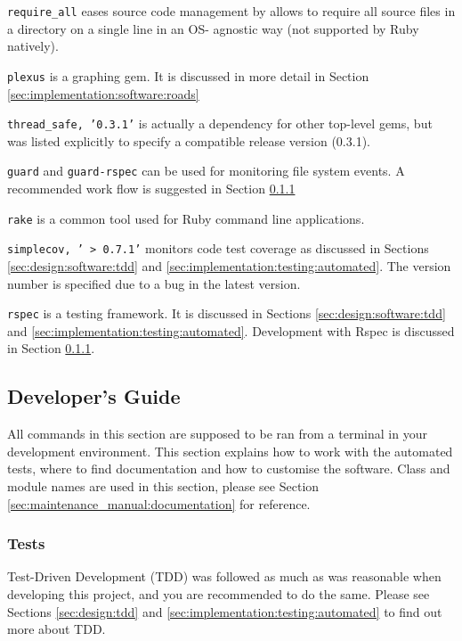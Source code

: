 \texttt{require\_all} \parencite{Require+all} eases source code management by
allows to require all source files in a directory on a single line in an OS-
agnostic way (not supported by Ruby natively).

\texttt{plexus} \parencite{Plexus} is a graphing gem. It is discussed in more
detail in Section \ref{sec:implementation:software:roads}

\texttt{thread\_safe, '0.3.1'} is actually a dependency for other top-level
gems, but was listed explicitly to specify a compatible release version
(0.3.1).

\texttt{guard} and \texttt{guard-rspec} \parencite{Guard} can be used for
monitoring file system events. A recommended work flow is suggested in Section
\ref{sec:maintenance_manual:testing}

\texttt{rake} \parencite{Rake} is a common tool used for Ruby command line
applications.

\texttt{simplecov, '~> 0.7.1'} \parencite{Simplecov} monitors code test
coverage as discussed in Sections \ref{sec:design:software:tdd} and
\ref{sec:implementation:testing:automated}. The version number is specified due
to a bug in the latest version.

\texttt{rspec} \parencite{Rspec} is a testing framework. It is discussed in
Sections \ref{sec:design:software:tdd} and
\ref{sec:implementation:testing:automated}. Development with Rspec is discussed
in Section \ref{sec:maintenance_manual:testing}.


\subsection{Developer's Guide}
\label{sec:maintenance_manual:developing}

All commands in this section are supposed to be ran from a terminal in your
development environment. This section explains how to work with the automated
tests, where to find documentation and how to customise the software. Class and
module names are used in this section, please see Section
\ref{sec:maintenance_manual:documentation} for reference.


\subsubsection{Tests}

\label{sec:maintenance_manual:testing}

Test-Driven Development (TDD) was followed as much as was reasonable when
developing this project, and you are recommended to do the same. Please see
Sections \ref{sec:design:tdd} and \ref{sec:implementation:testing:automated} to
find out more about TDD.

